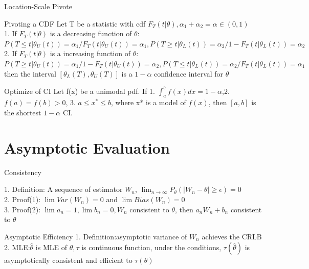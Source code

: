 \documentclass{article}
\begin{document}
\begin{multicols*}{3}
\begin{thmbox}{Location-Scale Pivote}
\end{thmbox}

\begin{thmbox}{Pivoting a CDF}
    Let T be a statistic with cdf $F_T(t\lvert\theta), \alpha_1 + \alpha_2 = \alpha \in (0,1)$ \\
    1. If $F_T(t\lvert \theta)$ is a decreasing function of $\theta$: $P(T \le t \lvert \theta_U(t)) = \alpha_1 / F_T(t \lvert \theta_U(t)) = \alpha_1, P(T \ge t \lvert \theta_L(t)) = \alpha_2/ 1- F_T(t \lvert \theta_L(t)) = \alpha_2$ \\
    2. If $F_T(t\lvert \theta)$ is a increasing function of $\theta$: $P(T\ge t \lvert \theta_U(t)) = \alpha_1 / 1-F_T(t \lvert \theta_U(t)) = \alpha_2, P(T \le t \lvert \theta_L(t)) = \alpha_2 /F_T(t \lvert \theta_L(t)) = \alpha_1$ \\
    then the interval $[\theta_L(T), \theta_U(T)]$ is a $1 - \alpha$ confidence interval for $\theta$
    
\end{thmbox}

\begin{thmbox}{Optimize of CI}
    Let f(x) be a unimodal pdf. If 1. $\int^b_a f(x) dx = 1 - \alpha$,2. $f(a) = f(b) > 0$, 3. $a \le x^* \le b$, where x* is a model of $f(x)$, then $[a,b]$ is the shortest $1 - \alpha$ CI.
\end{thmbox}
\section{Asymptotic Evaluation}

\begin{thmbox}{Consistency}

    1. Definition: A sequence of estimator $W_n$, $ \lim_{n \to \infty}P_{\theta}(\lvert W_n - \theta\rvert \ge \epsilon) = 0$\\
    2. Proof(1): $\lim Var(W_n) = 0$ and $\lim Bias(W_n) = 0$ \\
   3. Proof(2): $\lim a_n = 1, \lim b_n = 0, W_n$ consistent to $\theta$, then $a_n W_n + b_n$ consistent to $\theta$

\end{thmbox}

\begin{thmbox}{Asymptotic Efficiency}
    1. Definition:asymptotic variance of $W_n$ achieves the CRLB\\
    2.  MLE:$\hat{\theta}$ is MLE of $\theta, \tau$ is continuous function, under the conditions, $\tau(\hat{\theta})$ is asymptotically consistent and  efficient to $\tau(\theta)$
\end{thmbox}


\end{multicols*}
\end{document}
